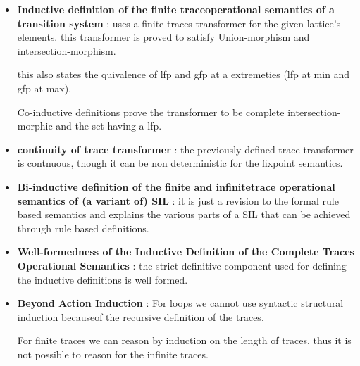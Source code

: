 \begin{itemize}
{	example :  forming a set of even numbers using a rule based and operator definition. 
	}

	\item{\textbf{Inductive definition of the finite traceoperational semantics of a transition system} : uses a finite traces transformer for the given lattice's elements. this transformer is proved to satisfy Union-morphism and intersection-morphism.

	this also states the quivalence of lfp and gfp at a extremeties (lfp at min and gfp at max).

	Co-inductive definitions prove the transformer to be complete intersection-morphic and the set having a lfp. 
	}

	\item{\textbf{continuity of trace transformer} : the previously defined trace transformer is contnuous, though it can be non deterministic for the fixpoint semantics.
	}

	\item{\textbf{Bi-inductive definition of the finite and infinitetrace operational semantics of (a variant of) SIL} :  it is just a revision to the formal rule based semantics and explains the various parts of a SIL that can be achieved through rule based definitions.
	}

	\item{\textbf{Well-formedness of the Inductive Definition of the Complete Traces Operational Semantics} : the strict definitive component used for defining the inductive definitions is well formed. 
	}

	\item{\textbf{Beyond Action Induction} : 
	For loops we cannot use syntactic structural induction becauseof the recursive definition of the traces.

	For finite traces we can reason by induction on the length of traces, thus it is not possible to reason for the infinite traces. 
	}

\end{itemize}
